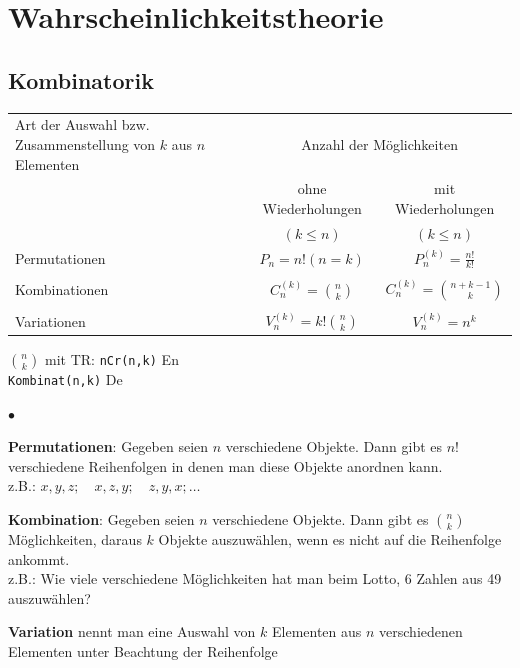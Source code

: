 \section{Wahrscheinlichkeitstheorie}
	\subsection{Kombinatorik}
		\begin{minipage}{13.5cm}
		\begin{tabular}{| p{5.5cm} | c | c |}
			\hline
			Art der Auswahl bzw. Zusammenstellung von $k$ aus $n$ Elementen	& \multicolumn{2}{c|}{Anzahl der Möglichkeiten}\\
 			& ohne Wiederholungen		& mit Wiederholungen\\
 			& $(k\leq n)$ 				& $(k\leq n)$ \\
 			\hline
 			Permutationen & $P_n=n!(n=k)$ &
 			$P_n^{(k)}=\frac{n!}{k!}$ \\ & &\\
 			Kombinationen & $C_n^{(k)}=\binom n k$ &
 			$C_n^{(k)}=\binom{n+k-1} k$\\
 			& &\\
 			Variationen & $V_n^{(k)}=k!\binom n k$ & $V_n^{(k)}=n^k$\\
 			\hline
		\end{tabular}
		\end{minipage}
		\begin{minipage}{5cm}
		$\binom n k$ mit TR: \texttt{nCr(n,k)} \hspace{9.3mm}En\\
		\hspace*{19mm} \texttt{Kombinat(n,k)} De
		\end{minipage}
		\begin{list}{$\bullet$}{\setlength{\itemsep}{0cm} \setlength{\parsep}{0cm} \setlength{\topsep}{0.1cm}} 
         	\item \textbf{Permutationen}: Gegeben seien $n$ verschiedene Objekte. Dann gibt es $n!$
         	verschiedene Reihenfolgen in denen man diese Objekte anordnen
         	kann. \\
         	z.B.: $x,y,z;\quad x,z,y;\quad z,y,x;\ldots$
		 	\item \textbf{Kombination}: Gegeben seien $n$ verschiedene Objekte. Dann gibt es $\binom n k$
		 	Möglichkeiten, daraus $k$ Objekte auszuwählen, wenn es nicht auf die Reihenfolge
		 	ankommt. \\
		 	z.B.: Wie viele verschiedene Möglichkeiten hat man beim Lotto, 6 Zahlen aus 49
		 	auszuwählen?
		  \item \textbf{Variation} nennt man eine Auswahl von $k$ Elementen aus $n$
		  		verschiedenen Elementen unter Beachtung der Reihenfolge
        \end{list}
        

